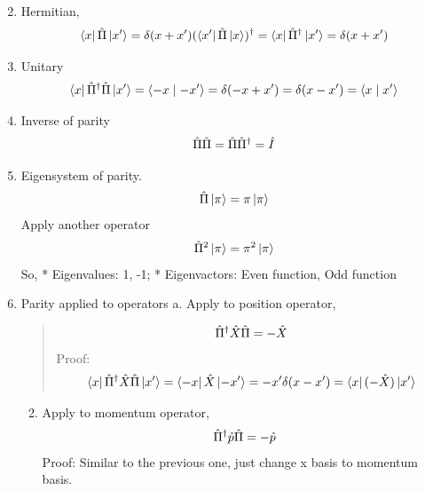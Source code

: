 \documentclass[letterpaper,10pt,english]{sphinxmanual}
\newcommand{\bra}[1]{\left\langle #1\right|}
\newcommand{\ket}[1]{\left| #1\right\rangle}
\newcommand{\braket}[2]{\langle #1 \mid #2 \rangle}
\begin{document}
\begin{enumerate}
\setcounter{enumi}{1}
\item {} 
Hermitian,
\begin{gather}
\begin{split}\bra{x}\hat \Pi \ket{x'} = \delta(x+x')
(\bra{x'}\hat \Pi \ket{x})^\dagger = \bra{x}\hat \Pi^\dagger \ket{x'} =\delta(x+x')\end{split}\notag
\end{gather}
\item {} 
Unitary
\begin{gather}
\begin{split}\bra{x}\hat \Pi^\dagger \hat \Pi \ket{x'}= \braket{-x}{-x'}=\delta(-x+x')=\delta(x-x')=\braket{x}{x'}\end{split}\notag
\end{gather}
\item {} 
Inverse of parity
\begin{gather}
\begin{split}\hat \Pi \hat \Pi = \hat \Pi \hat \Pi^\dagger = \hat I\end{split}\notag
\end{gather}
\item {} 
Eigensystem of parity.
\begin{gather}
\begin{split}\hat \Pi \ket{\pi}=\pi\ket{\pi}\end{split}\notag
\end{gather}
Apply another operator
\begin{gather}
\begin{split}\hat \Pi^2 \ket{\pi} = \pi^2 \ket{\pi}\end{split}\notag
\end{gather}
So,
* Eigenvalues: 1, -1;
* Eigenvactors: Even function, Odd function

\item {} 
Parity applied to operators
a. Apply to position operator,
\begin{quote}
\begin{gather}
\begin{split}\hat \Pi^\dagger \hat X \hat \Pi = -\hat X\end{split}\notag
\end{gather}
Proof:
\begin{gather}
\begin{split}\bra{x}\hat \Pi ^\dagger \hat X \hat \Pi \ket{x'} = \bra{-x}\hat X \ket{-x'}= -x'\delta(x-x') = \bra{x}(-\hat X)\ket{x'}\end{split}\notag
\end{gather}\end{quote}
\begin{enumerate}
\setcounter{enumi}{1}
\item {} 
Apply to momentum operator,
\begin{gather}
\begin{split}\hat \Pi^\dagger \hat p \hat \Pi = -\hat p\end{split}\notag
\end{gather}
Proof: Similar to the previous one, just change x basis to momentum basis.


\end{enumerate}
\end{enumerate}
\end{document}
